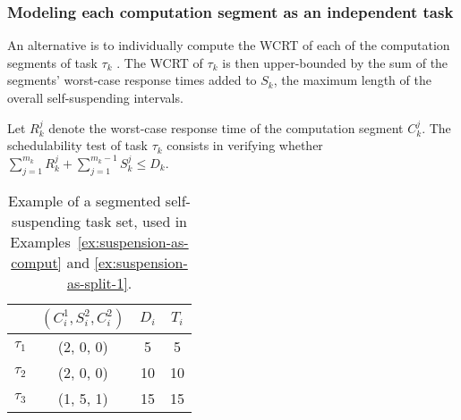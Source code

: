 

\subsubsection{Modeling each computation segment as an independent task}
\label{sec:model-interferred:split}

An alternative is to individually compute the WCRT of each of the computation segments of task $\tau_k$ \cite{bletsas:thesis,PH:rtss98}. 
The WCRT of $\tau_k$ is then upper-bounded by the sum of the segments' worst-case response times added to $S_k$, the maximum length of the overall
self-suspending intervals. 
 
Let $R_k^j$ denote the worst-case response time of the computation segment $C_k^j$. The schedulability test of task $\tau_k$ consists 
in verifying whether $\sum_{j=1}^{m_k} R_k^j + \sum_{j=1}^{m_k-1} S_k^j \leq D_k $. 

\begin{table}[t]
\centering
    \begin{tabular}{|c|c|c|c|}
 \hline
        & $(C_i^1, S_i^2, C_i^2)$ &  $D_i$ & $T_i$\\ 
        \hline
        $\tau_1$ & (2, 0, 0) &  5 & 5\\ 
        $\tau_2$ &  (2, 0, 0) & 10 & 10 \\ 
        $\tau_3$ & (1, 5, 1) & 15  & 15\\
        \hline
    \end{tabular} 
    \caption{Example of a segmented self-suspending task set, used in Examples~\ref{ex:suspension-as-comput} and \ref{ex:suspension-as-split-1}.}
    \label{table:static-example}
\end{table}

